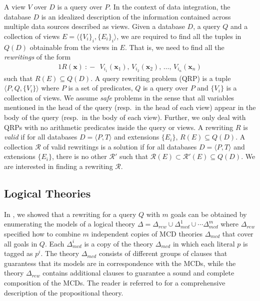 \documentclass{sig-alternate}
\newcommand{\tup}[1]{\langle #1 \rangle}
\newcommand{\vvec}[1]{\mathbf{#1}}
\newcommand{\R}{\mathcal{R}}
\newcommand{\qrule}{:\!\!-}
\begin{document}
A view $V$ over $D$ is a query over $P$. In the context of data
integration, the database $D$ is an idealized description of 
the information contained across multiple data sources described
as views.
Given a database $D$, a query $Q$ and a collection of 
views $E=\tup{\{V_i\}_i,\{E_i\}_i}$, we are required to find
all the tuples in $Q(D)$ obtainable from the views in $E$.
That is, we need to find all the \emph{rewritings} of the form
\begin{alignat*}{1}
R(\vvec{x})\ \qrule\ \ V_{i_1}(\vvec{x}_1),\, V_{i_2}(\vvec{x}_2),\, \ldots,\, V_{i_n}(\vvec{x}_n)
\end{alignat*}
such that $R(E) \subseteq Q(D)$.
A query rewriting problem (QRP) is a tuple $\tup{P,Q,\{V_i\}}$ where $P$
is a set of predicates, $Q$ is a query over $P$ and $\{V_i\}$ is a collection
of views. We assume \emph{safe} problems in the sense that all 
variables mentioned in the head of the query (resp.\ in the head of each view)
appear in the body of the query (resp.\ in the body of each view).
Further, we only deal with QRPs with no arithmetic predicates inside the
query or views.
A rewriting $R$ is \emph{valid} if for all databases $D=\tup{P,T}$
and extensions $\{E_i\}$, $R(E) \subseteq Q(D)$.
A collection $\R$ of valid rewritings is a solution if
for all databases $D=\tup{P,T}$ and extensions $\{E_i\}$, there
is no other $\R'$ such that $\R(E)\subset\R'(E)\subseteq Q(D)$.
We are interested in finding a rewriting $\R$.

\subsection{Logical Theories}

In \cite{arvelo:aaai06}, we showed that a rewriting
for a query $Q$ with $m$ goals can be obtained by enumerating the
models of a logical theory
$\Delta=\Delta_{rew}\cup\Delta_{mcd}^1\cup\cdots\Delta_{mcd}^m$
where $\Delta_{rew}$ specified how to combine $m$ independent
copies of MCD theories $\Delta_{mcd}$ that cover all goals in $Q$.
Each $\Delta^i_{mcd}$ is a copy of the theory $\Delta_{mcd}$
in which each literal $p$ is tagged as $p^i$.
The theory $\Delta_{mcd}$ consists of different groups of 
clauses that guarantess that its models are in correspondence
with the MCDs, while the theory $\Delta_{rew}$ contains additional
clauses to guarantee a sound and complete composition of the MCDs.
The reader is referred to \cite{arvelo:aaai06} for a comprehensive
description of the propositional theory.
\end{document}

